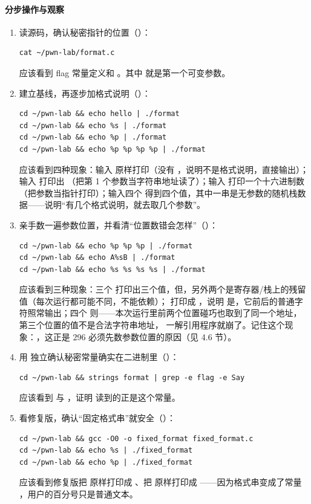 \documentclass[UTF8,12pt,oneside]{ctexbook}
\begin{document}
\paragraph{分步操作与观察}
\begin{enumerate}[label=\arabic*.]
\item 读源码，确认秘密指针的位置（）：
\begin{lstlisting}
cat ~/pwn-lab/format.c
\end{lstlisting}
应该看到 flag 常量定义和 。其中  就是第一个可变参数。
\item 建立基线，再逐步加格式说明（）：
\begin{lstlisting}
cd ~/pwn-lab && echo hello | ./format
cd ~/pwn-lab && echo %s | ./format
cd ~/pwn-lab && echo %p | ./format
cd ~/pwn-lab && echo %p %p %p %p | ./format
\end{lstlisting}
应该看到四种现象：输入  原样打印（没有 \code{\%}，说明不是格式说明，直接输出）；输入  打印出 （把第 1 个参数当字符串地址读了）；输入  打印一个十六进制数 （把参数当指针打印）；输入四个  得到四个值，其中一串是无参数的随机栈数据——说明“有几个格式说明，就去取几个参数”。
\item 亲手数一遍参数位置，并看清“位置数错会怎样”（）：
\begin{lstlisting}
cd ~/pwn-lab && echo %p %p %p | ./format
cd ~/pwn-lab && echo A%sB | ./format
cd ~/pwn-lab && echo %s %s %s %s | ./format
\end{lstlisting}
应该看到三种现象：三个  打印出三个值，但，另外两个是寄存器/栈上的残留值（每次运行都可能不同，不能依赖）； 打印成 ，说明  是，它前后的普通字符照常输出；四个  则——本次运行里前两个位置碰巧也取到了同一个地址，第三个位置的值不是合法字符串地址， 一解引用程序就崩了。记住这个现象：，这正是 296 必须先数参数位置的原因（见 4.6 节）。
\item 用  独立确认秘密常量确实在二进制里（）：
\begin{lstlisting}
cd ~/pwn-lab && strings format | grep -e flag -e Say
\end{lstlisting}
应该看到  与 ，证明  读到的正是这个常量。
\item 看修复版，确认“固定格式串”就安全（）：
\begin{lstlisting}
cd ~/pwn-lab && gcc -O0 -o fixed_format fixed_format.c
cd ~/pwn-lab && echo %s | ./fixed_format
cd ~/pwn-lab && echo %p | ./fixed_format
\end{lstlisting}
应该看到修复版把  原样打印成 、把  原样打印成 ——因为格式串变成了常量 ，用户的百分号只是普通文本。
\end{enumerate}
\end{document}
